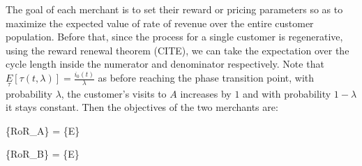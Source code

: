 The goal of each merchant is to set their reward or pricing parameters so as to maximize the expected value of rate of revenue over the entire customer population.
Before that, since the process for a single customer is regenerative, using the reward renewal theorem (CITE), we can take the expectation over the cycle length inside the numerator and denominator respectively.
Note that $\underset{\tau}E[\tau(t,\lambda)] = \frac{i_0(t)}{\lambda}$ as before reaching the phase transition point, with probability $\lambda$, the customer's visits to $A$ increases by $1$ and with probability $1-\lambda$ it stays constant.
Then the objectives of the two merchants are:

\beq
{}\max\left\{RoR_A\right\} = \max\left\{E\right\}
\eeq

\beq
{}\max\left\{RoR_B\right\} = \max\left\{E\right\}
\eeq
